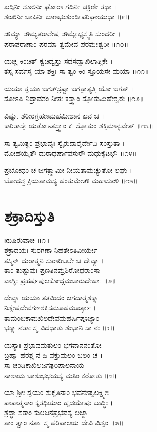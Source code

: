 ಖಡ್ಗಿನೀ ಶೂಲಿನೀ ಘೋರಾ ಗದಿನೀ ಚಕ್ರಿಣೀ ತಥಾ ।\\
ಶಂಖಿನೀ ಚಾಪಿನೀ ಬಾಣಭುಶುಂಡೀಪರಿಘಾಯುಧಾ ॥೯॥

ಸೌಮ್ಯಾ ಸೌಮ್ಯತರಾಶೇಷ ಸೌಮ್ಯೇಭ್ಯಸ್ತ್ವತಿ ಸುಂದರೀ ।\\
ಪರಾಪರಾಣಾಂ ಪರಮಾ ತ್ವಮೇವ ಪರಮೇಶ್ವರೀ ॥೧೦॥

ಯಚ್ಚ ಕಿಂಚಿತ್ ಕ್ವಚಿದ್ವಸ್ತು ಸದಸದ್ವಾಖಿಲಾತ್ಮಿಕೇ ।\\
ತಸ್ಯ ಸರ್ವಸ್ಯ ಯಾ ಶಕ್ತಿಃ ಸಾ ತ್ವಂ ಕಿಂ ಸ್ತೂಯಸೇ ಮಯಾ ॥೧೧॥

ಯಯಾ ತ್ವಯಾ ಜಗತ್‌ಸ್ರಷ್ಟಾ ಜಗತ್ಪಾತ್ಯತ್ತಿ ಯೋ ಜಗತ್ ।\\
ಸೋಽಪಿ ನಿದ್ರಾವಶಂ ನೀತಃ ಕಸ್ತ್ವಾಂ ಸ್ತೋತುಮಿಹೇಶ್ವರಃ ॥೧೨॥

ವಿಷ್ಣುಃ ಶರೀರಗ್ರಹಣಮಹಮೀಶಾನ ಏವ ಚ ।\\
ಕಾರಿತಾಸ್ತೇ ಯತೋಽತಸ್ತ್ವಾಂ ಕಃ ಸ್ತೋತುಂ ಶಕ್ತಿಮಾನ್ಭವೇತ್ ॥೧೩॥

ಸಾ ತ್ವಮಿತ್ಥಂ ಪ್ರಭಾವೈಃ ಸ್ವೈರುದಾರೈರ್ದೇವಿ ಸಂಸ್ತುತಾ ।\\
ಮೋಹಯೈತೌ ದುರಾಧರ್ಷಾವಸುರೌ ಮಧುಕೈಟಭೌ ॥೧೪॥

ಪ್ರಬೋಧಂ ಚ ಜಗತ್ಸ್ವಾಮೀ ನೀಯತಾಮಚ್ಯುತೋ ಲಘು ।\\
ಬೋಧಶ್ಚ ಕ್ರಿಯತಾಮಸ್ಯ ಹಂತುಮೇತೌ ಮಹಾಸುರೌ ॥೧೫॥


\section{ಶಕ್ರಾದಿಸ್ತುತಿ}
          ಋಷಿರುವಾಚ ॥೧॥\\
     ಶಕ್ರಾದಯಃ ಸುರಗಣಾ ನಿಹತೇಽತಿವೀರ್ಯೇ\\
ತಸ್ಮಿನ್ ದುರಾತ್ಮನಿ ಸುರಾರಿಬಲೇ ಚ ದೇವ್ಯಾ ।\\
     ತಾಂ ತುಷ್ಟುವುಃ ಪ್ರಣತಿನಮ್ರಶಿರೋಧರಾಂಸಾ\\
ವಾಗ್ಭಿಃ ಪ್ರಹರ್ಷಪುಲಕೋದ್ಗಮಚಾರುದೇಹಾಃ ॥೨॥

     ದೇವ್ಯಾ ಯಯಾ ತತಮಿದಂ ಜಗದಾತ್ಮಶಕ್ತ್ಯಾ\\
ನಿಶ್ಶೇಷದೇವಗಣಶಕ್ತಿಸಮೂಹಮೂರ್ತ್ಯಾ ।\\
     ತಾಮಂಬಿಕಾಮಖಿಲದೇವಮಹರ್ಷಿಪೂಜ್ಯಾಂ\\
ಭಕ್ತ್ಯಾ ನತಾಃ ಸ್ಮ ವಿದಧಾತು ಶುಭಾನಿ ಸಾ ನಃ ॥೩॥

     ಯಸ್ಯಾಃ ಪ್ರಭಾವಮತುಲಂ ಭಗವಾನನಂತೋ\\
ಬ್ರಹ್ಮಾ ಹರಶ್ಚ ನ ಹಿ ವಕ್ತುಮಲಂ ಬಲಂ ಚ ।\\
     ಸಾ ಚಂಡಿಕಾಖಿಲಜಗತ್ಪರಿಪಾಲನಾಯ\\
ನಾಶಾಯ ಚಾಶುಭಭಯಸ್ಯ ಮತಿಂ ಕರೋತು ॥೪॥

     ಯಾ ಶ್ರೀಃ ಸ್ವಯಂ ಸುಕೃತಿನಾಂ ಭವನೇಷ್ವಲಕ್ಷ್ಮೀಃ\\
ಪಾಪಾತ್ಮನಾಂ ಕೃತಧಿಯಾಂ ಹೃದಯೇಷು ಬುದ್ಧಿಃ ।\\
     ಶ್ರದ್ಧಾ ಸತಾಂ ಕುಲಜನಪ್ರಭವಸ್ಯ ಲಜ್ಜಾ\\
ತಾಂ ತ್ವಾಂ ನತಾಃ ಸ್ಮ ಪರಿಪಾಲಯ ದೇವಿ ವಿಶ್ವಂ ॥೫॥

